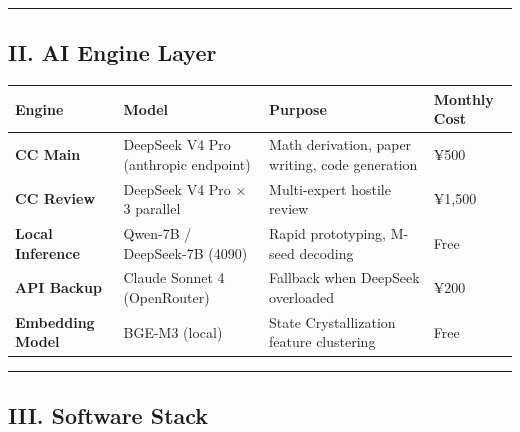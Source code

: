 \documentclass[
  12pt,
]{article}
\begin{document}
\begin{center}\rule{0.5\linewidth}{0.5pt}\end{center}

\subsection{II. AI Engine Layer}\label{ii-ai-engine-layer}

\begin{longtable}[]{@{}%
  >{\raggedright\arraybackslash}p{}%
  >{\raggedright\arraybackslash}p{}%
  >{\raggedright\arraybackslash}p{}%
  >{\raggedright\arraybackslash}p{}@{}}
\toprule\noalign{}
\begin{minipage}[b]{\linewidth}\raggedright
Engine
\end{minipage} & \begin{minipage}[b]{\linewidth}\raggedright
Model
\end{minipage} & \begin{minipage}[b]{\linewidth}\raggedright
Purpose
\end{minipage} & \begin{minipage}[b]{\linewidth}\raggedright
Monthly Cost
\end{minipage} \\
\midrule\noalign{}
\endhead
\bottomrule\noalign{}
\endlastfoot
\textbf{CC Main} & DeepSeek V4 Pro (anthropic endpoint) & Math derivation, paper writing, code generation & ¥500 \\
\textbf{CC Review} & DeepSeek V4 Pro × 3 parallel & Multi-expert hostile review & ¥1,500 \\
\textbf{Local Inference} & Qwen-7B / DeepSeek-7B (4090) & Rapid prototyping, M-seed decoding & Free \\
\textbf{API Backup} & Claude Sonnet 4 (OpenRouter) & Fallback when DeepSeek overloaded & ¥200 \\
\textbf{Embedding Model} & BGE-M3 (local) & State Crystallization feature clustering & Free \\
\end{longtable}

\begin{center}\rule{0.5\linewidth}{0.5pt}\end{center}

\subsection{III. Software Stack}\label{iii-software-stack}
\end{document}
